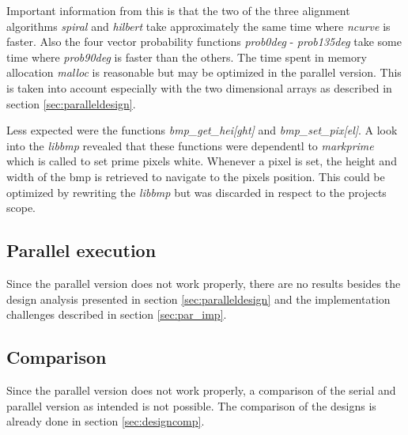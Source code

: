 Important information from this is that the two of the three alignment algorithms \emph{spiral} and \emph{hilbert} take approximately the same time where \emph{ncurve} is faster. Also the four vector probability functions \emph{prob0deg} - \emph{prob135deg} take some time where \emph{prob90deg} is faster than the others. The time spent in memory allocation \emph{malloc} is reasonable but may be optimized in the parallel version. This is taken into account especially with the two dimensional arrays as described in section \ref{sec:paralleldesign}.

Less expected were the functions \emph{bmp\_get\_hei[ght]} and \emph{bmp\_set\_pix[el]}. A look into the \emph{libbmp} revealed that these functions were dependentl to \emph{markprime} which is called to set prime pixels white. Whenever a pixel is set, the height and width of the bmp is retrieved to navigate to the pixels position. This could be optimized by rewriting the \emph{libbmp} but was discarded in respect to the projects scope.

\subsection{Parallel execution}
\label{sec:par_ex}
Since the parallel version does not work properly, there are no results besides the design analysis presented in section \ref{sec:paralleldesign} and the implementation challenges described in section \ref{sec:par_imp}.

\subsection{Comparison}
Since the parallel version does not work properly, a comparison of the serial and parallel version as intended is not possible. The comparison of the designs is already done in section \ref{sec:designcomp}.





